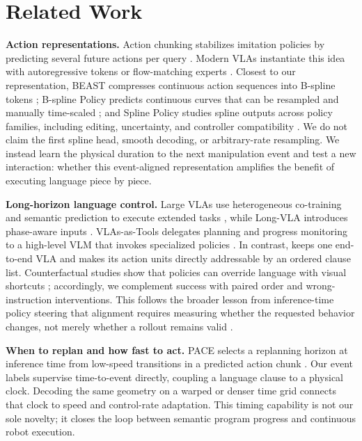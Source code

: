 \section{Related Work}
\label{sec:related_works}

\textbf{Action representations.}
Action chunking stabilizes imitation policies by predicting several future actions per query \cite{zhao2023act,chi2023diffusion}. Modern VLAs instantiate this idea with autoregressive tokens or flow-matching experts \cite{pertsch2025fast,black2024pi0,shukor2025smolvla}. Closest to our representation, BEAST compresses continuous action sequences into B-spline tokens \cite{zhou2025beast}; B-spline Policy predicts continuous curves that can be resampled and manually time-scaled \cite{han2026bsp}; and Spline Policy studies spline outputs across policy families, including editing, uncertainty, and controller compatibility \cite{tian2026spline}. We do not claim the first spline head, smooth decoding, or arbitrary-rate resampling. We instead learn the physical duration to the next manipulation event and test a new interaction: whether this event-aligned representation amplifies the benefit of executing language piece by piece.

\textbf{Long-horizon language control.}
Large VLAs use heterogeneous co-training and semantic prediction to execute extended tasks \cite{black2025pi05}, while Long-VLA introduces phase-aware inputs \cite{fan2025longvla}. VLAs-as-Tools delegates planning and progress monitoring to a high-level VLM that invokes specialized policies \cite{lei2026tools}. In contrast, \method{} keeps one end-to-end VLA and makes its action units directly addressable by an ordered clause list. Counterfactual studies show that policies can override language with visual shortcuts \cite{glossop2025cast,fang2026counterfactual}; accordingly, we complement success with paired order and wrong-instruction interventions. This follows the broader lesson from inference-time policy steering that alignment requires measuring whether the requested behavior changes, not merely whether a rollout remains valid \cite{wang2025itps}.

\textbf{When to replan and how fast to act.}
PACE selects a replanning horizon at inference time from low-speed transitions in a predicted action chunk \cite{nie2026pace}. Our event labels supervise time-to-event directly, coupling a language clause to a physical clock. Decoding the same geometry on a warped or denser time grid connects that clock to speed and control-rate adaptation. This timing capability is not our sole novelty; it closes the loop between semantic program progress and continuous robot execution.
